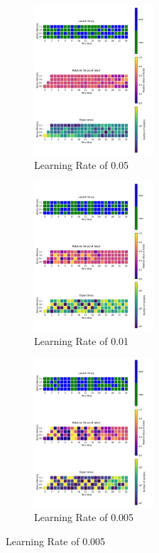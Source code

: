 \documentclass[a4paper]{article}
\begin{document}
\begin{figure}[ht]
    \centering
    \begin{subfigure}[b]{0.24\textwidth}
        \centering
        \includegraphics[width=12em]{../figures/policy_b2_lr05.pdf}
        \caption{Learning Rate of 0.05}
        \label{b2_lr05}
    \end{subfigure}
    \begin{subfigure}[b]{0.24\textwidth}
        \centering
        \includegraphics[width=12em]{../figures/policy_b2_lr01.pdf}
        \caption{Learning Rate of 0.01}
        \label{b2_lr01}
    \end{subfigure}
    \begin{subfigure}[b]{0.24\textwidth}
        \centering
        \includegraphics[width=12em]{../figures/policy_b2_lr005.pdf}
        \caption{Learning Rate of 0.005}
        \label{b2_lr005}
    \end{subfigure}

\end{figure}
\end{document}
